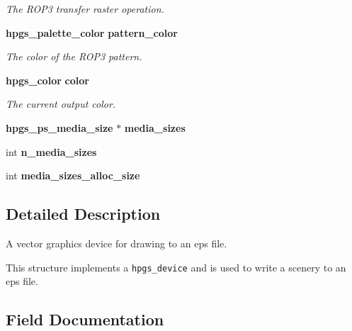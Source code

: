 \begin{CompactItemize}
\begin{CompactList}\small\item\em The ROP3 transfer raster operation. \item\end{CompactList}\item 
{\bf hpgs\_\-palette\_\-color} {\bf pattern\_\-color}\label{structhpgs__eps__device__st_dfb015c261644a5faa40a438efcefc2e}

\begin{CompactList}\small\item\em The color of the ROP3 pattern. \item\end{CompactList}\item 
{\bf hpgs\_\-color} {\bf color}\label{structhpgs__eps__device__st_ca327facc8998124ab6a9689ede14c14}

\begin{CompactList}\small\item\em The current output color. \item\end{CompactList}\end{CompactItemize}
\begin{Indent}{\bf }\par
\begin{CompactItemize}
\item 
{\bf hpgs\_\-ps\_\-media\_\-size} $\ast$ {\bf media\_\-sizes}
\item 
int {\bf n\_\-media\_\-sizes}
\item 
int \textbf{media\_\-sizes\_\-alloc\_\-size}\label{structhpgs__eps__device__st_72089500083511841858f7b6727b2799}

\end{CompactItemize}
\end{Indent}


\subsection{Detailed Description}
A vector graphics device for drawing to an eps file. 

This structure implements a {\tt hpgs\_\-device} and is used to write a scenery to an eps file. 

\subsection{Field Documentation}
